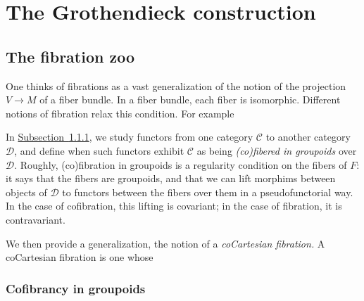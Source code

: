\documentclass[main.tex]{subfiles}
\begin{document}
\newcommand{\ssmash}{\overset{\star}{\wedge}}

\chapter{The Grothendieck construction}
\label{ch:the_grothendieck_construction}

\section{The fibration zoo}
\label{sec:the_fibration_zoo}

One thinks of fibrations as a vast generalization of the notion of the projection $V \to M$ of a fiber bundle. In a fiber bundle, each fiber is isomorphic. Different notions of fibration relax this condition. For example

In \hyperref[ssc:cofibrancy_in_groupoids]{Subsection~\ref*{ssc:cofibrancy_in_groupoids}}, we study functors from one category $\mathcal{C}$ to another category $\mathcal{D}$, and define when such functors exhibit $\mathcal{C}$ as being \emph{(co)fibered in groupoids} over $\mathcal{D}$. Roughly, (co)fibration in groupoids is a regularity condition on the fibers of $F$: it says that the fibers are groupoids, and that we can lift morphims between objects of $\mathcal{D}$ to functors between the fibers over them in a pseudofunctorial way. In the case of cofibration, this lifting is covariant; in the case of fibration, it is contravariant.

We then provide a generalization, the notion of a \emph{coCartesian fibration.} A coCartesian fibration is one whose

\subsection{Cofibrancy in groupoids}
\label{ssc:cofibrancy_in_groupoids}
\end{document}
